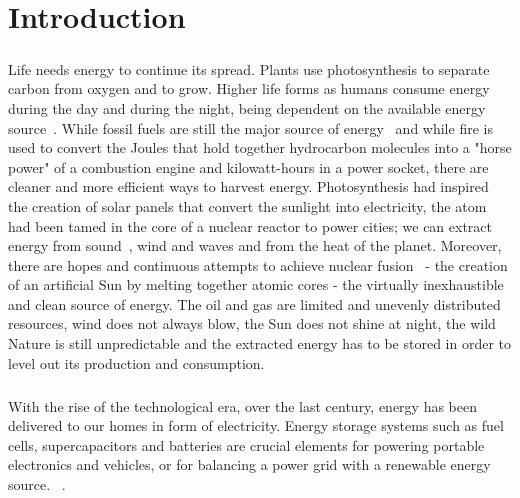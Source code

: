 \chapter{Introduction}
\paragraph*{}
Life needs energy to continue its spread. Plants use photosynthesis to separate carbon from oxygen and to grow. Higher life forms as humans consume energy during the day and during the night, being dependent on the available energy source~\cite{energy_consumption_review}. While fossil fuels are still the major source of energy~\cite{energy_sources_review} and while fire is used to convert the Joules that hold together hydrocarbon molecules into a "horse power" of a combustion engine and kilowatt-hours in a power socket, there are cleaner and more efficient ways to harvest energy. Photosynthesis had inspired the creation of solar panels that convert the sunlight into electricity, the atom had been tamed in the core of a nuclear reactor to power cities; we can extract energy from sound~\cite{energy_from_sound}, wind and waves and from the heat of the planet. Moreover, there are hopes and continuous attempts to achieve nuclear fusion~\cite{tokamak_updates} - the creation of an artificial Sun by melting together atomic cores - the virtually inexhaustible and clean source of energy. The oil and gas are limited and unevenly distributed resources, wind does not always blow, the Sun does not shine at night, the wild Nature is still unpredictable and the extracted energy has to be stored in order to level out its production and consumption.\\
\paragraph*{}
With the rise of the technological era, over the last century, energy has been delivered to our homes in form of electricity. Energy storage systems such as fuel cells, supercapacitors and batteries are crucial elements for powering portable electronics and vehicles, or for balancing a power grid with a renewable energy source. ~\cite{janoschka2012_advmater}. 
